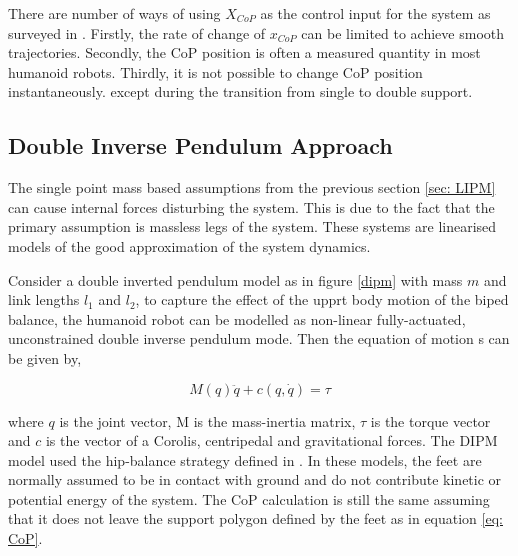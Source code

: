 There are number of ways of using $X_{CoP}$ as the control input for the system as surveyed in \cite{elhasairi2015humanoid}.
Firstly, the rate of change of $x_{CoP}$ can be limited to achieve smooth trajectories. Secondly, the CoP position is often a measured quantity in most humanoid robots. Thirdly, it is not possible to change CoP position instantaneously. except during the 
transition from single to double support. 






\subsection{Double Inverse Pendulum Approach}
\label{sec: DIPM}

The single point mass based assumptions from the previous section \ref{sec: LIPM} can cause internal forces disturbing the system. This is due to the fact that the primary assumption is massless legs of the system.
These systems are linearised models of the good approximation of the system dynamics. 

Consider a double inverted pendulum model as in figure \ref{dipm} with mass $m$ and link lengths $l_1$ and $l_2$, to capture the effect of the upprt body motion of the biped balance, the humanoid robot can be modelled as 
non-linear fully-actuated, unconstrained double inverse pendulum mode. Then the equation of motion s can be given by,

\begin{equation}
    \label{eq: DIPM}
    M(q)\ddot{q} + c(q, \dot{q}) = \tau
\end{equation}

where $q$ is the joint vector, M is the mass-inertia matrix, $\tau$ is the torque vector and $c$ is the vector of a Corolis, centripedal and gravitational forces. The DIPM model used the hip-balance strategy defined in \cite{atkeson2007multiple}. In these models, the feet are normally
assumed to be in contact with ground and do not contribute kinetic or potential energy of the system. The CoP calculation is still the same assuming that it does not leave the support polygon defined by the feet as in equation \ref{eq: CoP}.
 
